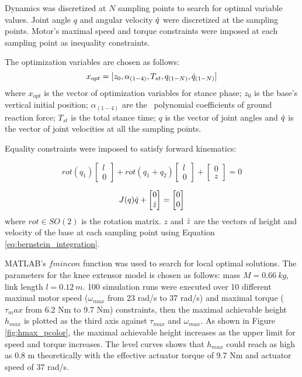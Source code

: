 Dynamics was discretized at $N$ sampling points to search for optimal variable values. Joint angle $q$ and angular velocity ${\dot{q}}$ were discretized at the sampling points. Motor's maximal speed and torque constraints were imposed at each sampling point as inequality constraints.

The optimization variables are chosen as follows:
\begin{equation}\label{eq:opt_var_knee}
x_{opt} = [z_0, \alpha_{(1-4)}, T_{st}, q_{(1-N)}, {\dot{q}}_{(1-N)}]
\end{equation}
where $x_{opt}$ is the vector of optimization variables for stance phase; $z_0$ is the base's vertical initial position; $\alpha_{(1-4)}$ are the \Bezier\ polynomial coefficients of ground reaction force; $T_{st}$ is the total stance time; $q$ is the vector of joint angles and ${\dot{q}}$ is the vector of joint velocities at all the sampling points.

Equality constraints were imposed to satisfy forward kinematics:

\begin{equation}
\label{eq:kin_position}
rot(q_1)
\left[\begin{matrix}
l\\0
\end{matrix}\right]
+
rot(q_1+q_2)\left[\begin{matrix}
l\\0
\end{matrix}\right]
+
\left[\begin{matrix}
0\\z
\end{matrix}\right]
=0
\end{equation}

\begin{equation}
\label{eq:kin_velocity}
J(q){\dot{q}}+\left[\begin{matrix}
0\\ {\dot{z}}
\end{matrix}
\right]
=
\left[\begin{matrix}
0\\0
\end{matrix}\right]
\end{equation}
where $rot\in SO(2)$ is the rotation matrix. $z$ and ${\dot{z}}$ are the vectors of height and velocity of the base at each sampling point using Equation \ref{eq:bernstein_integration}.


MATLAB's $fmincon$ function was used to search for local optimal solutions. The parameters for the knee extensor model is chosen as follows: mass $M = 0.66~kg$, link length $l=0.12~m$. 100 simulation runs were executed over 10 different maximal motor speed ($\omega_{max}$ from 23 rad/s to 37 rad/s) and maximal torque ($\tau_max$ from 6.2 Nm to 9.7 Nm) constraints, then the maximal achievable height $h_{max}$ is plotted as the third axis against $\tau_{max}$ and $\omega_{max}$. As shown in Figure \ref{fig:hmax_pcolor}, the maximal achievable height increases as the upper limit for speed and torque increases. The level curves shows that $h_{max}$ could reach as high as 0.8 m theoretically with the effective actuator torque of 9.7 Nm and actuator speed of 37 rad/s.

